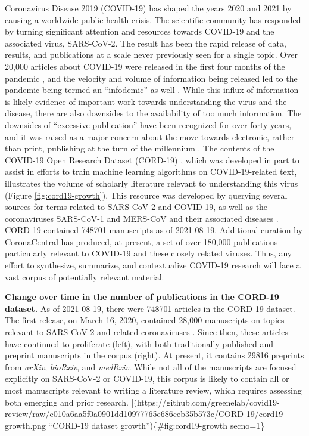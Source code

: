 \documentclass[twocolumn]{ceurart}
\begin{document}
Coronavirus Disease 2019 (COVID-19) has shaped the years 2020 and 2021 by causing a worldwide public health crisis.
The scientific community has responded by turning significant attention and resources towards COVID-19 and the associated virus, SARS-CoV-2.
The result has been the rapid release of data, results, and publications at a scale never previously seen for a single topic.
Over 20,000 articles about COVID-19 were released in the first four months of the pandemic \citep{7ub6VM4Z}, and the velocity and volume of information being released led to the pandemic being termed an ``infodemic'' as well \citep{7ub6VM4Z, nnfOazAC}.
While this influx of information is likely evidence of important work towards understanding the virus and the disease, there are also downsides to the availability of too much information.
The downsides of ``excessive publication'' have been recognized for over forty years, and it was raised as a major concern about the move towards electronic, rather than print, publishing at the turn of the millennium \citep{DfSr1Ohc}.
The contents of the COVID-19 Open Research Dataset (CORD-19) \citep{CiOwklc6}, which was developed in part to assist in efforts to train machine learning algorithms on COVID-19-related text, illustrates the volume of scholarly literature relevant to understanding this virus (Figure \ref{fig:cord19-growth}).
This resource was developed by querying several sources for terms related to SARS-CoV-2 and COVID-19, as well as the coronaviruses SARS-CoV-1 and MERS-CoV and their associated diseases \citep{CiOwklc6}.
CORD-19 contained 748701 manuscripts as of 2021-08-19.
Additional curation by CoronaCentral \citep{zQ1JIn2J} has produced, at present, a set of over 180,000 publications particularly relevant to COVID-19 and these closely related viruses.
Thus, any effort to synthesize, summarize, and contextualize COVID-19 research will face a vast corpus of potentially relevant material.

\textbf{Change over time in the number of publications in the CORD-19 dataset.}
As of 2021-08-19, there were 748701 articles in the CORD-19 dataset.
The first release, on March 16, 2020, contained 28,000 manuscripts on topics relevant to SARS-CoV-2 and related coronaviruses \citep{CiOwklc6}.
Since then, these articles have continued to proliferate (left), with both traditionally published and preprint manuscripts in the corpus (right).
At present, it contains 29816 preprints from \emph{arXiv}, \emph{bioRxiv}, and \emph{medRxiv}.
While not all of the manuscripts are focused explicitly on SARS-CoV-2 or COVID-19, this corpus is likely to contain all or most manuscripts relevant to writing a literature review, which requires assessing both emerging and prior research.
{]}(https://github.com/greenelab/covid19-review/raw/e010a6aa5f0a0901dd10977765e686ceb35b573c/CORD-19/cord19-growth.png ``CORD-19 dataset growth'')\{\#fig:cord19-growth secno=1\}
\end{document}

